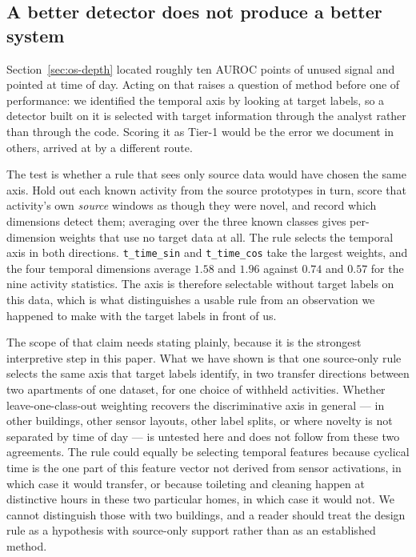 \subsection{A better detector does not produce a better system}
\label{sec:os-temporal}

Section~\ref{sec:os-depth} located roughly ten AUROC points of unused signal and pointed
at time of day. Acting on that raises a question of method before one of performance: we
identified the temporal axis by looking at target labels, so a detector built on it is
selected with target information through the analyst rather than through the code. Scoring
it as Tier-1 would be the error we document in others, arrived at by a different route.

The test is whether a rule that sees only source data would have chosen the same axis.
Hold out each known activity from the source prototypes in turn, score that activity's own
\emph{source} windows as though they were novel, and record which dimensions detect them;
averaging over the three known classes gives per-dimension weights that use no target data
at all. The rule selects the temporal axis in both directions. \texttt{t\_time\_sin} and
\texttt{t\_time\_cos} take the largest weights, and the four temporal dimensions average
$1.58$ and $1.96$ against $0.74$ and $0.57$ for the nine activity statistics. The axis is
therefore selectable without target labels on this data, which is what distinguishes a
usable rule from an observation we happened to make with the target labels in front of us.

The scope of that claim needs stating plainly, because it is the strongest interpretive
step in this paper. What we have shown is that one source-only rule selects the same axis
that target labels identify, in two transfer directions between two apartments of one
dataset, for one choice of withheld activities. Whether leave-one-class-out weighting
recovers the discriminative axis in general --- in other buildings, other sensor layouts,
other label splits, or where novelty is not separated by time of day --- is untested here
and does not follow from these two agreements. The rule could equally be selecting
temporal features because cyclical time is the one part of this feature vector not derived
from sensor activations, in which case it would transfer, or because toileting and
cleaning happen at distinctive hours in these two particular homes, in which case it would
not. We cannot distinguish those with two buildings, and a reader should treat the design
rule as a hypothesis with source-only support rather than as an established method.

